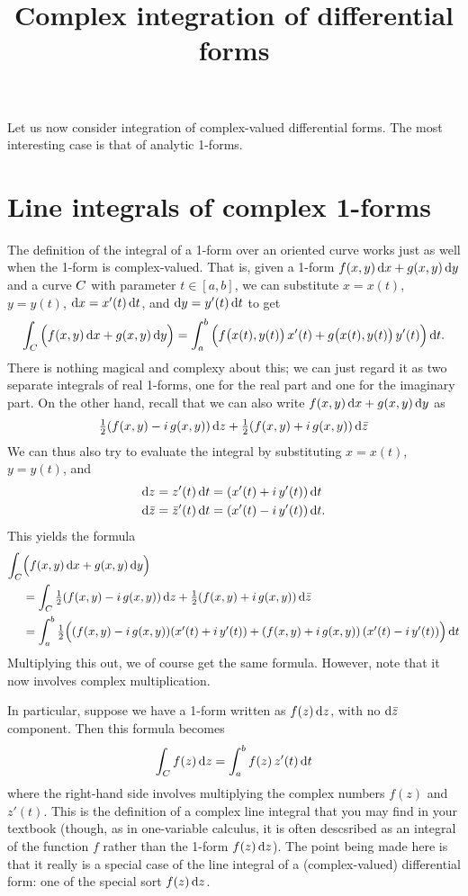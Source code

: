 \documentclass[12pt]{amsart}
\title{Complex integration of differential forms}
\begin{document}
\maketitle

Let us now consider integration of complex-valued differential forms.
The most interesting case is that of analytic 1-forms.

\section{Line integrals of complex 1-forms}
\label{sec:complex-line-integrals}

The definition of the integral of a 1-form over an oriented curve works just as well when the 1-form is complex-valued.
That is, given a 1-form $f(x,y)\,\dx + g(x,y)\,\dy$ and a curve $\curve$ with parameter $t\in [a,b]$, we can substitute $x = x(t)$, $y=y(t)$, $\dx = x'(t)\,\dt$, and $\dy = y'(t)\,\dt$ to get
\[ \lint{\curve} \Big(f(x,y)\,\dx + g(x,y)\,\dy\Big) = \itint t a b {\Big( f\big(x(t),y(t)\big)\, x'(t) + g\big(x(t),y(t)\big)\,y'(t)\Big)}. \]
There is nothing magical and complexy about this; we can just regard it as two separate integrals of real 1-forms, one for the real part and one for the imaginary part.
On the other hand, recall that we can also write $f(x,y)\,\dx + g(x,y)\,\dy$ as
\[\half (f(x,y) -i\, g(x,y))\,\dz + \half (f(x,y) +i\, g(x,y))\,\dzbar \]
We can thus also try to evaluate the integral by substituting $x = x(t)$, $y=y(t)$, and
\begin{align*}
  \dz &= z'(t) \,\dt = (x'(t) + i\,y'(t))\,\dt\\
  \dzbar &= \zbar'(t) \,\dt = (x'(t) - i\,y'(t))\,\dt.
\end{align*}
This yields the formula
\begin{align*}
  \lint{\curve} &\Big(f(x,y)\,\dx + g(x,y)\,\dy\Big)\\
  &= \lint{\curve} \half (f(x,y) -i\, g(x,y))\,\dz + \half (f(x,y) +i\, g(x,y))\,\dzbar\\
  &= \itint t a b {\half \Big((f(x,y) -i\, g(x,y)) (x'(t) + i\,y'(t)) + (f(x,y) +i\, g(x,y))\,(x'(t) - i\,y'(t))\Big)}
\end{align*}
Multiplying this out, we of course get the same formula.
However, note that it now involves complex multiplication.

In particular, suppose we have a 1-form written as $f(z) \,\dz$, with no $\dzbar$ component.
Then this formula becomes
\[ \lint{\curve} f(z) \,\dz = \itint t a b {f(z)\, z'(t)}\]
where the right-hand side involves multiplying the complex numbers $f(z)$ and $z'(t)$.
This is the definition of a complex line integral that you may find in your textbook (though, as in one-variable calculus, it is often descsribed as an integral of the function $f$ rather than the 1-form $f(z)\,\dz$).
The point being made here is that it really is a special case of the line integral of a (complex-valued) differential form: one of the special sort $f(z)\,\dz$.
\end{document}

